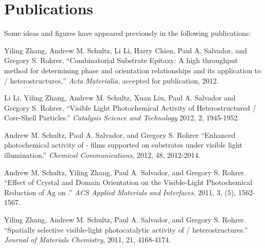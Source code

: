 

\chapter*{Publications}

Some ideas and figures have appeared previously in the following publications:



\begin{items}

\item Yiling Zhang, Andrew M. Schultz, Li Li, Harry Chien, Paul A. Salvador, and Gregory
S. Rohrer, ``Combinatorial Substrate Epitaxy: A high throughput method for determining
phase and orientation relationships and its application to /
heterostructures,'' \emph{Acta Materialia}, accepted for publication, 2012.

\item Li Li, Yiling Zhang, Andrew M. Schultz, Xuan Liu, Paul A. Salvador and Gregory S.
Rohrer, ``Visible Light Photochemical Activity of Heterostructured /
Core-Shell Particles.'' \emph{Catalysis Science and Technology} 2012, 2, 1945-1952.

\item Andrew M. Schultz, Paul A. Salvador, and Gregory S. Rohrer ``Enhanced photochemical
activity of \textalpha- films supported on  substrates under visible
light illumination.'' \emph{Chemical Communications}, 2012, 48, 2012-2014.

\item Andrew M. Schultz, Yiling Zhang, Paul A. Salvador, and Gregory S. Rohrer. ``Effect
of Crystal and Domain Orientation on the Visible-Light Photochemical Reduction of Ag on
.'' \emph{ACS Applied Materials and Interfaces}, 2011, 3, (5), 1562-1567.


\item Yiling Zhang, Andrew M. Schultz, Paul A. Salvador, and Gregory S. Rohrer.
``Spatially selective visible-light photocatalytic activity of /
heterostructures.'' \emph{Journal of Materials Chemistry}, 2011, 21, 4168-4174.

\end{items}

